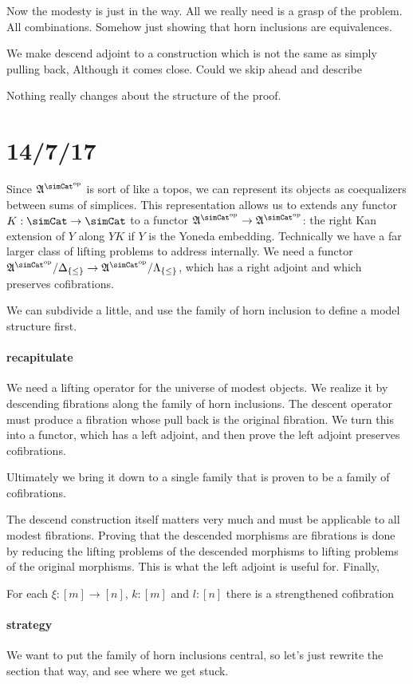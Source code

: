 \documentclass{tac}
\newcommand\set[1]{\left\{#1\right\}}
\newcommand\dual{^{\mathrm{op}}}
\newcommand\s{^{\simCat\dual}}
\newcommand\of{:}
\newcommand\simplex\Delta
\newcommand\horn\Lambda
\newcommand\ambient{\mathfrak A}
\begin{document}
Now the modesty is just in the way. All we really need is a grasp of the problem. 
All combinations.
Somehow just showing that horn inclusions are equivalences.

We make descend adjoint to a construction which is not the same as simply pulling back,
Although it comes close. Could we skip ahead and describe 

Nothing really changes about the structure of the proof.

\section{14/7/17}
Since $\ambient\s$ is sort of like a topos, we can represent its objects as coequalizers between sums of simplices. This representation allows us to extends any functor $K\of \simCat \to \simCat$ to a functor $\ambient\s\to\ambient\s$: the right Kan extension of $Y$ along $YK$ if $Y$ is the Yoneda embedding.
Technically we have a far larger class of lifting problems to address internally. We need a functor $\ambient\s/\simplex_{\set\leq}\to\ambient\s/\horn_{\set\leq}$, which has a right adjoint and which preserves cofibrations.

We can subdivide a little, and use the family of horn inclusion to define a model structure first.

\paragraph{recapitulate}
We need a lifting operator for the universe of modest objects. We realize it by descending fibrations along the family of horn inclusions. The descent operator must produce a fibration whose pull back is the original fibration. We turn this into a functor, which has a left adjoint, and then prove the left adjoint preserves cofibrations.

Ultimately we bring it down to a single family that is proven to be a family of cofibrations.

The descend construction itself matters very much and must be applicable to all modest fibrations.
Proving that the descended morphisms are fibrations is done by reducing the lifting problems of the descended morphisms to lifting problems of the original morphisms. This is what the left adjoint is useful for. Finally, 


For each $\xi\of [m]\to[n]$, $k\of[m]$ and $l\of[n]$ there is a strengthened cofibration 

\paragraph{strategy}
We want to put the family of horn inclusions central, so let's just rewrite the section that way, and see where we get stuck.
\end{document}
